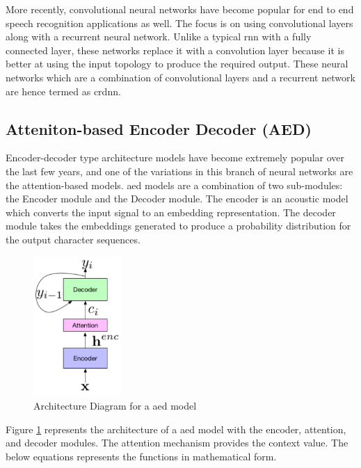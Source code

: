 More recently, convolutional neural networks have become popular for end to end speech recognition applications as well. \cite{Zhang2017VeryRecognition} The focus is on using convolutional layers along with a recurrent neural network. Unlike a typical \acrshort{rnn} with a fully connected layer, these networks replace it with a convolution layer because it is better at using the input topology to produce the required output. These neural networks which are a combination of convolutional layers and a recurrent network are hence termed as \acrfull{crdnn}. 

\subsection {Atteniton-based Encoder Decoder (AED)}
Encoder-decoder type architecture models have become extremely popular over the last few years, and one of the variations in this branch of neural networks are the attention-based models. \cite{Prabhavalkar2017ARecognition} \acrfull{aed} models are a combination of two sub-modules: the Encoder module and the Decoder module. The encoder is an acoustic model which converts the input signal to an embedding representation. The decoder module takes the embeddings generated to produce a probability distribution for the output character sequences. \cite{Zhang2017VeryRecognition, Chan2016ListenRecognition}

\begin{figure}[ht]
  \begin{center}
    \includegraphics[width=0.3\textwidth]{images/las.png} 
    \caption{Architecture Diagram for a \acrshort{aed} model  \cite{Chiu2017State-of-the-artModels}}
    \label{fig:las}
  \end{center}
\end{figure}

Figure \ref{fig:las} represents the architecture of a \acrshort{aed} model with the encoder, attention, and decoder modules. The attention mechanism provides the context value. The below equations represents the functions in mathematical form.

